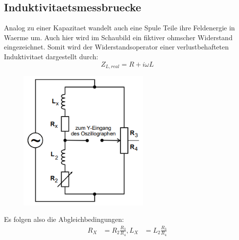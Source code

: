 \subsection{Induktivitaetsmessbruecke}
Analog zu einer Kapazitaet wandelt auch eine Spule Teile ihre Feldenergie in Waerme um. Auch hier wird im Schaubild ein fiktiver ohmscher Widerstand eingezeichnet. Somit wird der Widerstandsoperator einer verlustbehafteten Induktivitaet dargestellt durch:
\begin{equation}
    Z_{L,real}=R+i\omega L
\end{equation}
\begin{figure}[H]
    \centering
    \captionsetup{justification=centering}
    \includegraphics[height=7cm]{"Induktivitaet_Brueckenschaltung.png"}
    \label{Fig:Induktivitaet}
\end{figure}
Es folgen also die Abgleichbedingungen:
\begin{align}
    R_X&=R_2\frac{R_3}{R_4},
    L_X&=L_2\frac{R_3}{R_4}
\end{align}
